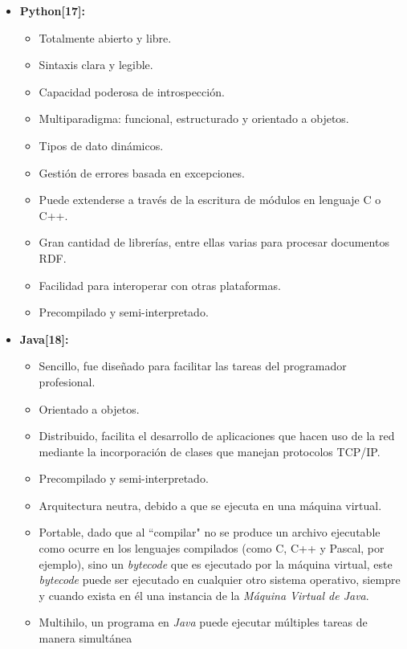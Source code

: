 \begin{itemize}
\item \textbf{Python[17]:}
    \begin{itemize}
    \item Totalmente abierto y libre.
    \item Sintaxis clara y legible.
    \item Capacidad poderosa de introspección.
    \item Multiparadigma: funcional, estructurado y orientado a objetos.
    \item Tipos de dato dinámicos.
    \item Gestión de errores basada en excepciones.
    \item Puede extenderse a través de la escritura de módulos en lenguaje C o C++.
    \item Gran cantidad de librerías, entre ellas varias para procesar documentos RDF.
    \item Facilidad para interoperar con otras plataformas.
    \item Precompilado y semi-interpretado.
    \end{itemize}
\item \textbf{Java[18]:}
    \begin{itemize}
    \item Sencillo, fue diseñado para facilitar las tareas del programador profesional.
    \item Orientado a objetos.
    \item Distribuido, facilita el desarrollo de aplicaciones que hacen uso de la red mediante la incorporación de clases que manejan protocolos TCP/IP.
    \item Precompilado y semi-interpretado.
    \item Arquitectura neutra, debido a que se ejecuta en una máquina virtual.
    \item Portable, dado que al ``compilar" no se produce un archivo ejecutable como ocurre en los lenguajes compilados (como C, C++ y Pascal, por ejemplo), sino un \textit{bytecode} que es ejecutado por la máquina virtual, este \textit{bytecode} puede ser ejecutado en cualquier otro sistema operativo, siempre y cuando exista en él una instancia de la \textit{Máquina Virtual de Java}.
    \item Multihilo, un programa en \textit{Java} puede ejecutar múltiples tareas de manera simultánea
    \end{itemize}
\end{itemize}

